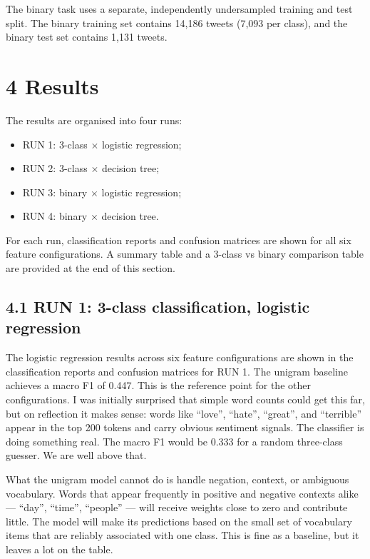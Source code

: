 \documentclass[12pt]{article}
\begin{document}
The binary task uses a separate, independently undersampled training and test split. The binary training set contains 14,186 tweets (7,093 per class), and the binary test set contains 1,131 tweets.

\section*{4 Results}

The results are organised into four runs:
\begin{itemize}
  \item RUN 1: 3-class $\times$ logistic regression;
  \item RUN 2: 3-class $\times$ decision tree;
  \item RUN 3: binary $\times$ logistic regression;
  \item RUN 4: binary $\times$ decision tree.
\end{itemize} For each run, classification reports and confusion matrices are shown for all six feature configurations. A summary table and a 3-class vs binary comparison table are provided at the end of this section.

\subsection*{4.1 RUN 1: 3-class classification, logistic regression}

The logistic regression results across six feature configurations are shown in the classification reports and confusion matrices for RUN 1. The unigram baseline achieves a macro F1 of 0.447. This is the reference point for the other configurations. I was initially surprised that simple word counts could get this far, but on reflection it makes sense: words like ``love'', ``hate'', ``great'', and ``terrible'' appear in the top 200 tokens and carry obvious sentiment signals. The classifier is doing something real. The macro F1 would be 0.333 for a random three-class guesser. We are well above that.

What the unigram model cannot do is handle negation, context, or ambiguous vocabulary. Words that appear frequently in positive and negative contexts alike --- ``day'', ``time'', ``people'' --- will receive weights close to zero and contribute little. The model will make its predictions based on the small set of vocabulary items that are reliably associated with one class. This is fine as a baseline, but it leaves a lot on the table.
\end{document}
